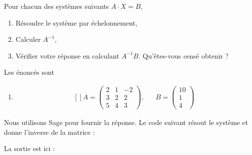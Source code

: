 \begin{example}     \label{ExBGCEooPIQgGW}


	Pour chacun des systèmes suivants $A\cdot X=B$,
	\begin{enumerate}

		\item
			Résoudre le système par échelonnement,
		\item
			Calculer $A^{-1}$,
		\item
			Vérifier votre réponse en calculant $A^{-1}B$. Qu'êtes-vous censé obtenir ?

	\end{enumerate}

	Les énoncés sont
	\begin{enumerate}

		\item
			\begin{equation}
				\begin{aligned}[]
					A=\begin{pmatrix}
						2	&	1	&	-2	\\
						3	&	2	&	2	\\
						5	&	4	&	3
					\end{pmatrix},
					&&B=\begin{pmatrix}
						10	\\
						1	\\
						4
					\end{pmatrix}
				\end{aligned}
			\end{equation}
	\end{enumerate}


	Nous utilisons Sage pour fournir la réponse. Le code suivant résout le système et donne l'inverse de la matrice :



La sortie est ici :




\end{example}

